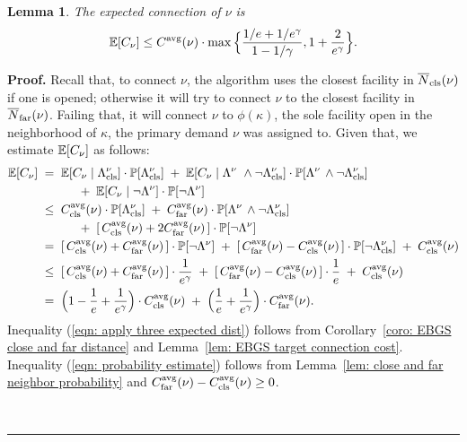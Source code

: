 \documentclass[oneside,final]{ucr}
\newtheorem{lemma}[theorem]{Lemma}
\newenvironment{proof}[1][Proof]{\textbf{#1.} }{\ \rule{0.5em}{0.5em}}
\begin{document}
\begin{lemma}\label{lem: EBGS nu's connection cost}
The expected connection of $\nu$ is
%
\begin{equation*}
\mathbb{E}[C_\nu] \le
  C^{{\mbox{\scriptsize\rm avg}}}(\nu)\cdot\max\Big\{\frac{1/e+1/e^\gamma}{1-1/\gamma}, 1+\frac{2}{e^\gamma}\Big\}.
\end{equation*}
\end{lemma}
\begin{proof}
  Recall that, to connect $\nu$, the algorithm uses the closest facility in
  ${\overline{N}}_{{\mbox{\scriptsize\rm cls}}}(\nu)$ if one is opened; otherwise it will try to connect $\nu$
  to the closest facility in ${\overline{N}}_{{\mbox{\scriptsize\rm far}}}(\nu)$. Failing that, it will
  connect $\nu$ to $\phi(\kappa)$, the sole facility open in the
  neighborhood of $\kappa$, the primary demand $\nu$ was assigned
  to. Given that, we estimate $\mathbb{E}[C_\nu]$ as follows:
%
  \begin{align}
    \mathbb{E}[C_{\nu}] 
		\;&= \;\mathbb{E}[C_{\nu}\mid \Lambda^\nu_{{\mbox{\scriptsize\rm cls}}}] \cdot \mathbb{P}[\Lambda^\nu_{{\mbox{\scriptsize\rm cls}}}]	
				\;+\; \mathbb{E}[C_{\nu}\mid \Lambda^\nu\ \wedge\neg \Lambda^\nu_{{\mbox{\scriptsize\rm cls}}}] 
				\cdot \mathbb{P}[\Lambda^\nu\, \wedge\neg \Lambda^\nu_{{\mbox{\scriptsize\rm cls}}}]	
				\notag
		\\
		& \quad\quad\quad
				+ \; \mathbb{E}[C_{\nu}\mid \neg \Lambda^\nu] \cdot \mathbb{P}[\neg \Lambda^\nu]
				\notag
		\\
		&\leq \; C_{{\mbox{\scriptsize\rm cls}}}^{{\mbox{\scriptsize\rm avg}}}(\nu) \cdot \mathbb{P}[\Lambda^\nu_{{\mbox{\scriptsize\rm cls}}}]
			\;+\; C_{{\mbox{\scriptsize\rm far}}}^{{\mbox{\scriptsize\rm avg}}}(\nu)	
				\cdot \mathbb{P}[\Lambda^\nu\, \wedge\neg \Lambda^\nu_{{\mbox{\scriptsize\rm cls}}}]
                      \label{eqn: apply three expected dist}
						\\
                        &\quad\quad\quad
			+\; [\,C_{{\mbox{\scriptsize\rm cls}}}^{{\mbox{\scriptsize\rm avg}}}(\nu) + 2C_{{\mbox{\scriptsize\rm far}}}^{{\mbox{\scriptsize\rm avg}}}(\nu)\,] \cdot \mathbb{P}[\neg\Lambda^\nu]
		\notag
		\\
                &=\; [\,C_{{\mbox{\scriptsize\rm cls}}}^{{\mbox{\scriptsize\rm avg}}}(\nu) + C_{{\mbox{\scriptsize\rm far}}}^{{\mbox{\scriptsize\rm avg}}}(\nu)\,]\cdot \mathbb{P}[\neg\Lambda^\nu] 
						\;+\; 
							[\,C_{{\mbox{\scriptsize\rm far}}}^{{\mbox{\scriptsize\rm avg}}}(\nu)   -C_{{\mbox{\scriptsize\rm cls}}}^{{\mbox{\scriptsize\rm avg}}}(\nu)\,]
                                \cdot \mathbb{P}[\neg\Lambda^\nu_{{\mbox{\scriptsize\rm cls}}}]
                              \;+\;  C_{{\mbox{\scriptsize\rm cls}}}^{{\mbox{\scriptsize\rm avg}}}(\nu)
                                                        \notag
		\\
             &\leq\; [\,C_{{\mbox{\scriptsize\rm cls}}}^{{\mbox{\scriptsize\rm avg}}}(\nu) + C_{{\mbox{\scriptsize\rm far}}}^{{\mbox{\scriptsize\rm avg}}}(\nu)\,] \cdot \frac{1}{e^\gamma}
             \;+\; [\,C_{{\mbox{\scriptsize\rm far}}}^{{\mbox{\scriptsize\rm avg}}}(\nu) - C_{{\mbox{\scriptsize\rm cls}}}^{{\mbox{\scriptsize\rm avg}}}(\nu)\,] \cdot \frac{1}{e}
             \;+\; C_{{\mbox{\scriptsize\rm cls}}}^{{\mbox{\scriptsize\rm avg}}}(\nu)
             \label{eqn: probability estimate}
             \\
             \notag
             &=\; \Big(1 - \frac{1}{e} + \frac{1}{e^\gamma}\Big)\cdot C_{{\mbox{\scriptsize\rm cls}}}^{{\mbox{\scriptsize\rm avg}}}(\nu)
 				\;+\; \Big(\frac{1}{e} + \frac{1}{e^\gamma}\Big)\cdot C_{{\mbox{\scriptsize\rm far}}}^{{\mbox{\scriptsize\rm avg}}}(\nu).
\end{align}
%
Inequality (\ref{eqn: apply three expected dist}) follows from
Corollary~\ref{coro: EBGS close and far distance} and 
Lemma~\ref{lem: EBGS target connection cost}. 
Inequality (\ref{eqn: probability estimate}) follows from 
Lemma~\ref{lem: close and far neighbor probability} and
$C_{{\mbox{\scriptsize\rm far}}}^{{\mbox{\scriptsize\rm avg}}}(\nu) - C_{{\mbox{\scriptsize\rm cls}}}^{{\mbox{\scriptsize\rm avg}}}(\nu)\ge 0$.


\end{proof}
\end{document}
